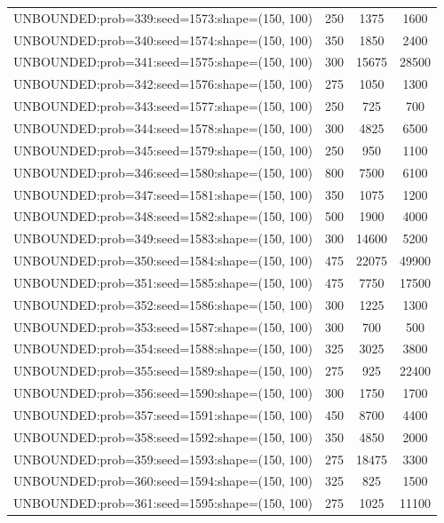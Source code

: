 \begin{longtable}{lccc}
UNBOUNDED:prob=339:seed=1573:shape=(150, 100) &      250 &  1375 &   1600 \\
UNBOUNDED:prob=340:seed=1574:shape=(150, 100) &      350 &  1850 &   2400 \\
UNBOUNDED:prob=341:seed=1575:shape=(150, 100) &      300 & 15675 &  28500 \\
UNBOUNDED:prob=342:seed=1576:shape=(150, 100) &      275 &  1050 &   1300 \\
UNBOUNDED:prob=343:seed=1577:shape=(150, 100) &      250 &   725 &    700 \\
UNBOUNDED:prob=344:seed=1578:shape=(150, 100) &      300 &  4825 &   6500 \\
UNBOUNDED:prob=345:seed=1579:shape=(150, 100) &      250 &   950 &   1100 \\
UNBOUNDED:prob=346:seed=1580:shape=(150, 100) &      800 &  7500 &   6100 \\
UNBOUNDED:prob=347:seed=1581:shape=(150, 100) &      350 &  1075 &   1200 \\
UNBOUNDED:prob=348:seed=1582:shape=(150, 100) &      500 &  1900 &   4000 \\
UNBOUNDED:prob=349:seed=1583:shape=(150, 100) &      300 & 14600 &   5200 \\
UNBOUNDED:prob=350:seed=1584:shape=(150, 100) &      475 & 22075 &  49900 \\
UNBOUNDED:prob=351:seed=1585:shape=(150, 100) &      475 &  7750 &  17500 \\
UNBOUNDED:prob=352:seed=1586:shape=(150, 100) &      300 &  1225 &   1300 \\
UNBOUNDED:prob=353:seed=1587:shape=(150, 100) &      300 &   700 &    500 \\
UNBOUNDED:prob=354:seed=1588:shape=(150, 100) &      325 &  3025 &   3800 \\
UNBOUNDED:prob=355:seed=1589:shape=(150, 100) &      275 &   925 &  22400 \\
UNBOUNDED:prob=356:seed=1590:shape=(150, 100) &      300 &  1750 &   1700 \\
UNBOUNDED:prob=357:seed=1591:shape=(150, 100) &      450 &  8700 &   4400 \\
UNBOUNDED:prob=358:seed=1592:shape=(150, 100) &      350 &  4850 &   2000 \\
UNBOUNDED:prob=359:seed=1593:shape=(150, 100) &      275 & 18475 &   3300 \\
UNBOUNDED:prob=360:seed=1594:shape=(150, 100) &      325 &   825 &   1500 \\
UNBOUNDED:prob=361:seed=1595:shape=(150, 100) &      275 &  1025 &  11100 \\

\end{longtable}
